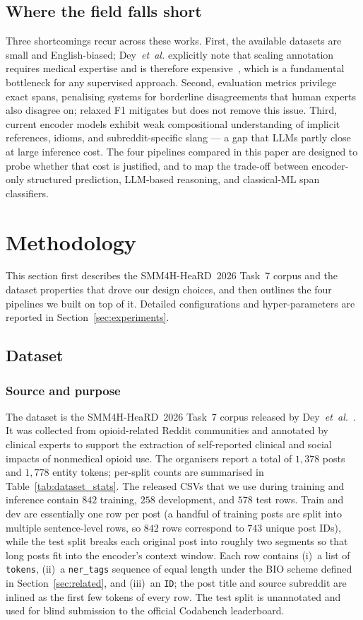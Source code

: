 \documentclass[journal]{IEEEtran}
\begin{document}
\subsection{Where the field falls short}
Three shortcomings recur across these works. First, the available
datasets are small and English-biased; Dey~\emph{et~al.} explicitly
note that scaling annotation requires medical expertise and is
therefore expensive~\cite{dey2025inference}, which is a fundamental
bottleneck for any supervised approach. Second, evaluation metrics
privilege exact spans, penalising systems for borderline disagreements
that human experts also disagree on; relaxed F1 mitigates but does not
remove this issue. Third, current encoder models exhibit weak
compositional understanding of implicit references, idioms, and
subreddit-specific slang --- a gap that LLMs partly close at large
inference cost. The four pipelines compared in this paper are designed
to probe whether that cost is justified, and to map the trade-off
between encoder-only structured prediction, LLM-based reasoning, and
classical-ML span classifiers.

\section{Methodology}
\label{sec:methodology}
This section first describes the SMM4H-HeaRD~2026 Task~7 corpus and
the dataset properties that drove our design choices, and then
outlines the four pipelines we built on top of it. Detailed
configurations and hyper-parameters are reported in
Section~\ref{sec:experiments}.

\subsection{Dataset}
\label{ssec:dataset}
\subsubsection{Source and purpose}
The dataset is the SMM4H-HeaRD~2026 Task~7 corpus released by
Dey~\emph{et~al.}~\cite{dey2025inference}. It was collected from
opioid-related Reddit communities and annotated by clinical experts to
support the extraction of self-reported clinical and social impacts of
nonmedical opioid use. The organisers report a total of $1{,}378$
posts and $1{,}778$ entity tokens; per-split counts are summarised in
Table~\ref{tab:dataset_stats}. The released CSVs that we use during
training and inference contain $842$ training, $258$ development, and
$578$ test rows. Train and dev are essentially one row per post (a
handful of training posts are split into multiple sentence-level
rows, so $842$ rows correspond to $743$ unique post IDs), while the
test split breaks each original post into roughly two segments so
that long posts fit into the encoder's context window. Each row
contains (i)~a list of \texttt{tokens}, (ii)~a \texttt{ner\_tags}
sequence of equal length under the BIO scheme defined in
Section~\ref{sec:related}, and (iii)~an \texttt{ID}; the post title
and source subreddit are inlined as the first few tokens of every
row. The test split is unannotated and used for blind submission to
the official Codabench leaderboard.
\end{document}
